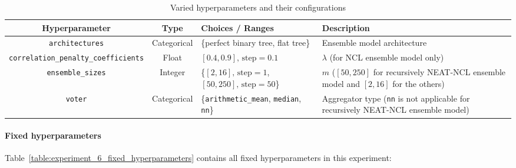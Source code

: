 \documentclass{article}
\begin{document}
\begin{table}[H]
    \centering
    \begin{tabular}{|c|c|p{3cm}|p{5cm}|}
        \hline
        Hyperparameter & Type & Choices / Ranges & Description \\
        \hline
        \small\texttt{architectures} & Categorical & \{perfect binary tree, flat tree\} & Ensemble model architecture \\
        \hline
        \small\texttt{correlation\_penalty\_coefficients} & Float & $[0.4, 0.9]\text{, step}=0.1$ & $\lambda$ (for NCL ensemble model only) \\
        \hline
        \small\texttt{ensemble\_sizes} & Integer & \{$[2, 16]\text{, step}=1$, $[50, 250]\text{, step}=50$\} & $m$ ($[50, 250]$ for recursively NEAT-NCL ensemble model and $[2, 16]$ for the others) \\
        \hline
        \small\texttt{voter} & Categorical & \{\texttt{arithmetic\_mean}, \texttt{median}, \texttt{nn}\} & Aggregator type (\texttt{nn} is not applicable for recursively NEAT-NCL ensemble model) \\
        \hline
    \end{tabular}
    \caption{Varied hyperparameters and their configurations}
    \label{table:experiment_6_varied_hyperparameters}
\end{table}

\paragraph{Fixed hyperparameters}
Table~\ref{table:experiment_6_fixed_hyperparameters} contains all fixed hyperparameters in this experiment: 
\end{document}
